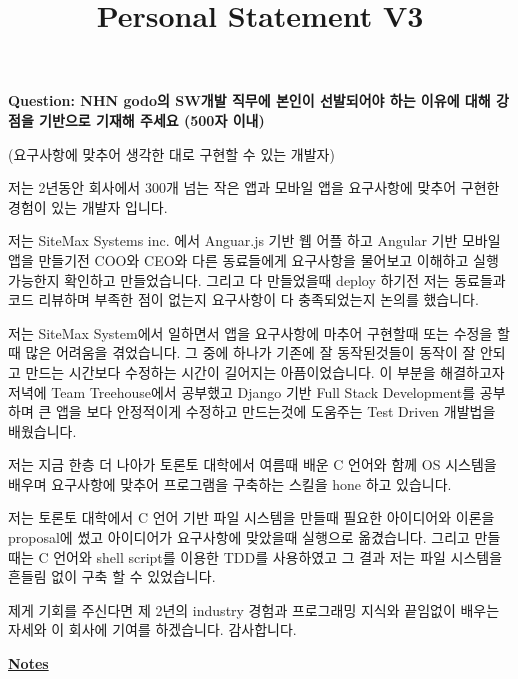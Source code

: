 \documentclass[12pt]{article}
\begin{document}
\title{Personal Statement V3}
\maketitle

\textbf{Question: NHN godo의 SW개발 직무에 본인이 선발되어야 하는 이유에 대해 강점을 기반으로 기재해 주세요 (500자 이내)}

\bigskip

(요구사항에 맞추어 생각한 대로 구현할 수 있는 개발자)

\bigskip

저는 2년동안 회사에서 300개 넘는 작은 앱과 모바일 앱을 요구사항에 맞추어 구현한 경험이 있는 개발자 입니다.

\bigskip

저는 SiteMax Systems inc. 에서 Anguar.js 기반 웹 어플 하고 Angular 기반 모바일 앱을 만들기전 COO와 CEO와 다른 동료들에게 요구사항을 물어보고 이해하고 실행 가능한지 확인하고 만들었습니다.
그리고 다 만들었을때 deploy 하기전 저는 동료들과 코드 리뷰하며 부족한 점이 없는지 요구사항이 다 충족되었는지 논의를 했습니다.

\bigskip

저는 SiteMax System에서 일하면서 앱을 요구사항에 마추어 구현할때 또는 수정을 할때 많은 어려움을 겪었습니다.
그 중에 하나가 기존에 잘 동작된것들이 동작이 잘 안되고 만드는 시간보다 수정하는 시간이 길어지는 아픔이었습니다.
이 부분을 해결하고자 저녁에 Team Treehouse에서 공부했고 Django 기반 Full Stack Development를
공부하며 큰 앱을 보다 안정적이게 수정하고 만드는것에 도움주는 Test Driven 개발법을 배웠습니다.

\bigskip

저는 지금 한층 더 나아가 토론토 대학에서 여름때 배운 C 언어와 함께 OS 시스템을 배우며 요구사항에 맞추어 프로그램을 구축하는 스킬을 hone 하고 있습니다.

\bigskip

저는 토론토 대학에서 C 언어 기반 파일 시스템을 만들때 필요한 아이디어와 이론을 proposal에 썼고 아이디어가 요구사항에 맞았을때 실행으로 옮겼습니다.
그리고 만들때는 C 언어와 shell script를 이용한 TDD를 사용하였고 그 결과 저는 파일 시스템을 흔들림 없이 구축 할 수 있었습니다.

\bigskip

제게 기회를 주신다면 제 2년의 industry 경험과 프로그래밍 지식와 끝임없이 배우는 자세와  이 회사에 기여를 하겠습니다. 감사합니다.

\underline{\textbf{Notes}}
\end{document}
